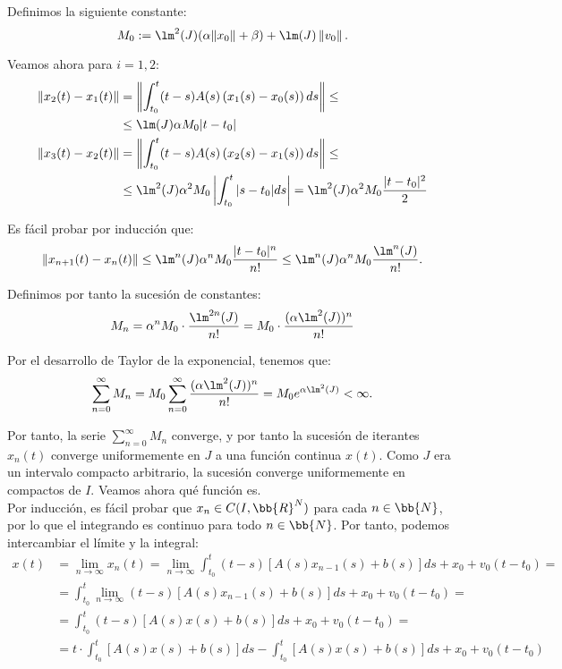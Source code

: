 \begin{ejercicio}
    Definimos la siguiente constante:
    \begin{equation*}
        M_0:= \lm^2(J)(\alpha\|x_0\|+\beta)+ \lm(J)\left\|v_0\right\|.
    \end{equation*}

    Veamos ahora para $i=1,2$:
    \begin{align*}
        \|x_2(t) - x_1(t)\| &= \left\|\int_{t_0}^t (t - s)A(s)\left(x_1(s) - x_0(s)\right)ds\right\|
        \leq \\&\leq
        \lm(J)\alpha M_0 |t-t_0|\\
        \|x_3(t) - x_2(t)\| &= \left\|\int_{t_0}^t (t - s)A(s)\left(x_2(s) - x_1(s)\right)ds\right\|
        \leq \\&\leq
        \lm^2(J)\alpha^2 M_0 \left|\int_{t_0}^t |s-t_0|ds\right|
        = \lm^2(J)\alpha^2 M_0 \frac{|t-t_0|^2}{2}
    \end{align*}

    Es fácil probar por inducción que:
    \begin{equation*}
        \|x_{n+1}(t) - x_{n}(t)\| \leq \lm^{n}(J)\alpha^{n}M_0\frac{|t-t_0|^{n}}{n!}\leq \lm^{n}(J)\alpha^{n}M_0\frac{\lm^{n}(J)}{n!}.
    \end{equation*}

    Definimos por tanto la sucesión de constantes:
    \begin{equation*}
        M_{n} = \alpha^{n}M_0\cdot \frac{\lm^{2n}(J)}{n!}
        = M_0\cdot \frac{(\alpha\lm^2(J))^n}{n!}
    \end{equation*}

    Por el desarrollo de Taylor de la exponencial, tenemos que:
    \begin{equation*}
        \sum_{n=0}^{\infty}M_n = M_0\sum_{n=0}^{\infty}\frac{(\alpha\lm^2(J))^n}{n!} = M_0e^{\alpha\lm^2(J)}<\infty.
    \end{equation*}

    Por tanto, la serie $\sum\limits_{n=0}^{\infty}M_n$ converge, y por tanto la sucesión de iterantes $x_n(t)$ converge uniformemente en $J$ a una función continua $x(t)$. Como $J$ era un intervalo compacto arbitrario, la sucesión converge uniformemente en compactos de $I$. Veamos ahora qué función es.\\
    
    Por inducción, es fácil probar que $x_n\in C(I, \bb{R}^N)$ para cada $n\in \bb{N}$, por lo que el integrando es continuo para todo $n\in \bb{N}$. Por tanto, podemos intercambiar el límite y la integral:
    \begin{align*}
        x(t) &= \lim_{n\to \infty}x_n(t)
        = \lim_{n\to \infty}\int_{t_0}^t (t - s)[A(s)x_{n-1}(s) + b(s)]ds + x_0 + v_0(t - t_0)
        =\\&=
        \int_{t_0}^t \lim_{n\to \infty}(t - s)[A(s)x_{n-1}(s) + b(s)]ds + x_0 + v_0(t - t_0)
        =\\&=
        \int_{t_0}^t (t - s)[A(s)x(s) + b(s)]ds + x_0 + v_0(t - t_0)
        =\\&= 
        t\cdot \int_{t_0}^t[A(s)x(s) + b(s)]ds -\int_{t_0}^t[A(s)x(s) + b(s)]ds + x_0 + v_0(t - t_0)
    \end{align*}


\end{ejercicio}
